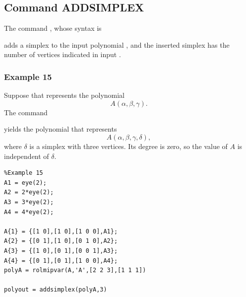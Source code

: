 \documentclass[english,11pt]{article}
\theoremstyle{break} \theorembodyfont{\small\rm}
\begin{document}
\subsection*{Command ADDSIMPLEX}

The command , whose syntax is

\vspace{0.5cm}%
\noindent\begin{minipage}{\linewidth}
\end{minipage}
\vspace{0.2cm}

\noindent adds a simplex to the input polynomial , and the inserted
simplex has the number of vertices indicated in input .

\subsubsection*{Example 15}

Suppose that  represents the polynomial
\[
 A(\alpha,\beta,\gamma).
\]
The command

\vspace{0.5cm}%
\noindent\begin{minipage}{\linewidth}
\end{minipage}
\vspace{0.2cm}

\noindent yields the polynomial 
that represents
\[
 A(\alpha,\beta,\gamma,\delta),
\]
where $\delta$ is a simplex with three vertices.
Its degree is zero, so the value of $A$ is independent of $\delta$.

\begin{minipage}{9.5cm}
 \begin{lstlisting}
%Example 15
A1 = eye(2);
A2 = 2*eye(2);
A3 = 3*eye(2);
A4 = 4*eye(2);

A{1} = {[1 0],[1 0],[1 0 0],A1};
A{2} = {[0 1],[1 0],[0 1 0],A2};
A{3} = {[1 0],[0 1],[0 0 1],A3};
A{4} = {[0 1],[0 1],[1 0 0],A4};
polyA = rolmipvar(A,'A',[2 2 3],[1 1 1])

polyout = addsimplex(polyA,3)
 \end{lstlisting}
\end{minipage}
\vspace{0.2cm}
\end{document}
